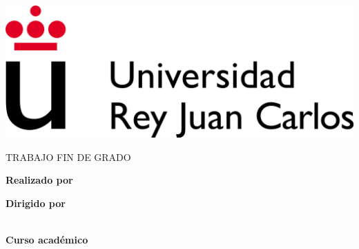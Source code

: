 \thispagestyle{empty} %
\begin{center}

\vspace*{1cm}

\includegraphics[scale=0.12]{figures/urjc_logo.png}

\vspace*{2cm}
\begin{large}
TRABAJO FIN DE GRADO
\end{large}

\vspace*{0.1in}
\textbf{\huge \tfgTitle}

\vspace*{1cm}

{\huge \tfgDegree}

\vspace*{0.1in}

{\large \tfgDepartment}

\vspace*{1cm}

\textbf{{\large Realizado por}}\\
{\large \tfgAuthors}

\vspace*{0.2in}

\textbf{{\large Dirigido por}}\\
{\large \tfgSupervisor}\\

\vspace*{0.2in}

\vspace*{.6in}
\textbf{\Large Curso académico \tfgYear}

\end{center}

\ifdefined\tfgDedication
    \newpage
    \thispagestyle{empty}
    
    \vspace*{\fill}
    \begin{center}
    \textit{\tfgDedication}
    \end{center}
    \vspace*{\fill}
\fi

\clearpage\setcounter{page}{1} %
